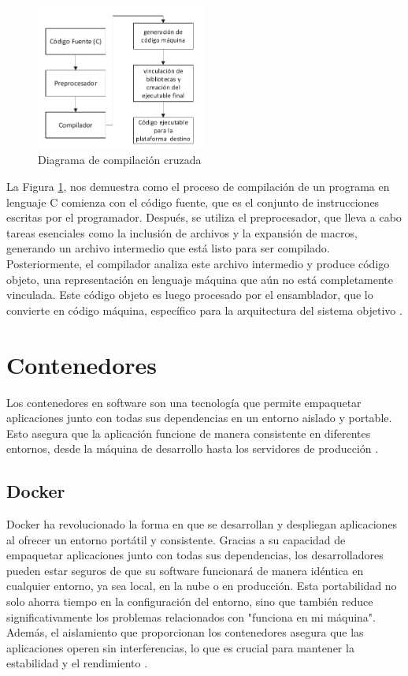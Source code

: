 \begin{figure}[h!]
    \centering
    \includegraphics[width=0.5\textwidth]{fig/teorico/Flujo de trabajo xcompiler.pdf}
    \caption{Diagrama de compilación cruzada}
    \label{fig:xcompile_workflow}
\end{figure}

La Figura \ref{fig:xcompile_workflow}, nos demuestra como el proceso de compilación de un programa en lenguaje C comienza con el código fuente, que es el conjunto de instrucciones escritas por el programador. Después, se utiliza el preprocesador, que lleva a cabo tareas esenciales como la inclusión de archivos y la expansión de macros, generando un archivo intermedio que está listo para ser compilado. Posteriormente, el compilador analiza este archivo intermedio y produce código objeto, una representación en lenguaje máquina que aún no está completamente vinculada. Este código objeto es luego procesado por el ensamblador, que lo convierte en código máquina, específico para la arquitectura del sistema objetivo \cite{horan2013cross}.

\section{Contenedores}\label{sec:containers}

Los contenedores en software son una tecnología que permite empaquetar aplicaciones junto con todas sus dependencias en un entorno aislado y portable. Esto asegura que la aplicación funcione de manera consistente en diferentes entornos, desde la máquina de desarrollo hasta los servidores de producción \cite{martinez2022docker}.

\subsection{Docker}

Docker ha revolucionado la forma en que se desarrollan y despliegan aplicaciones al ofrecer un entorno portátil y consistente. Gracias a su capacidad de empaquetar aplicaciones junto con todas sus dependencias, los desarrolladores pueden estar seguros de que su software funcionará de manera idéntica en cualquier entorno, ya sea local, en la nube o en producción. Esta portabilidad no solo ahorra tiempo en la configuración del entorno, sino que también reduce significativamente los problemas relacionados con "funciona en mi máquina". Además, el aislamiento que proporcionan los contenedores asegura que las aplicaciones operen sin interferencias, lo que es crucial para mantener la estabilidad y el rendimiento \cite{docker2020docker}.

